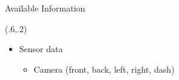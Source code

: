 \documentclass[aspectratio=169]{beamer}
\begin{document}
\begin{frame}{Available Information}
    \begin{textblock*}{.25\paperwidth} (.6\paperwidth,.2\paperheight)
    \end{textblock*}
    \begin{itemize}[<+(1)->] %
        \item Sensor data
            \begin{itemize}
                \item Camera (front, back, left, right, dash)

\end{itemize}
\end{itemize}
\end{frame}
\end{document}
